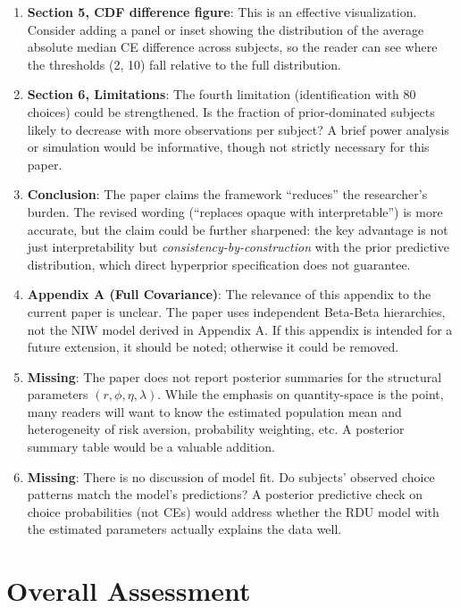 \documentclass[12pt]{article}
\begin{document}
\begin{enumerate}[leftmargin=*]
\item \textbf{Section 5, CDF difference figure}: This is an effective
visualization. Consider adding a panel or inset showing the distribution of
the average absolute median CE difference across subjects, so the reader can
see where the thresholds (2, 10) fall relative to the full distribution.

\item \textbf{Section 6, Limitations}: The fourth limitation (identification
with 80 choices) could be strengthened. Is the fraction of prior-dominated
subjects likely to decrease with more observations per subject? A brief power
analysis or simulation would be informative, though not strictly necessary for
this paper.

\item \textbf{Conclusion}: The paper claims the framework ``reduces'' the
researcher's burden. The revised wording (``replaces opaque with
interpretable'') is more accurate, but the claim could be further sharpened:
the key advantage is not just interpretability but
\textit{consistency-by-construction} with the prior predictive distribution,
which direct hyperprior specification does not guarantee.

\item \textbf{Appendix A (Full Covariance)}: The relevance of this appendix
to the current paper is unclear. The paper uses independent Beta-Beta
hierarchies, not the NIW model derived in Appendix A. If this appendix is
intended for a future extension, it should be noted; otherwise it could be
removed.

\item \textbf{Missing}: The paper does not report posterior summaries for the
structural parameters $(r, \phi, \eta, \lambda)$. While the emphasis on
quantity-space is the point, many readers will want to know the estimated
population mean and heterogeneity of risk aversion, probability weighting,
etc. A posterior summary table would be a valuable addition.

\item \textbf{Missing}: There is no discussion of model fit. Do subjects'
observed choice patterns match the model's predictions? A posterior predictive
check on choice probabilities (not CEs) would address whether the RDU model
with the estimated parameters actually explains the data well.

\end{enumerate}

\section*{Overall Assessment}
\end{document}
